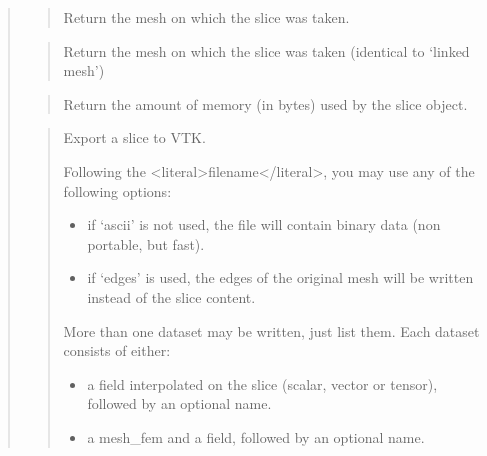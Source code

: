 \documentclass[a4paper,11pt,english]{sphinxmanual}
\begin{document}
\begin{quote}
\sphinxAtStartPar
{}
\begin{quote}

\sphinxAtStartPar
Return the mesh on which the slice was taken.
\end{quote}

\sphinxAtStartPar
{}
\begin{quote}

\sphinxAtStartPar
Return the mesh on which the slice was taken
(identical to ‘linked mesh’)
\end{quote}

\sphinxAtStartPar
{}
\begin{quote}

\sphinxAtStartPar
Return the amount of memory (in bytes) used by the slice object.
\end{quote}

\sphinxAtStartPar
{}
\begin{quote}

\sphinxAtStartPar
Export a slice to VTK.

\sphinxAtStartPar
Following the \textless{}literal\textgreater{}filename\textless{}/literal\textgreater{}, you may use any of the following options:
\begin{itemize}
\item {} 
\sphinxAtStartPar
if ‘ascii’ is not used, the file will contain binary data
(non portable, but fast).

\item {} 
\sphinxAtStartPar
if ‘edges’ is used, the edges of the original mesh will be
written instead of the slice content.

\end{itemize}

\sphinxAtStartPar
More than one dataset may be written, just list them. Each dataset
consists of either:
\begin{itemize}
\item {} 
\sphinxAtStartPar
a field interpolated on the slice (scalar, vector or tensor),
followed by an optional name.

\item {} 
\sphinxAtStartPar
a mesh\_fem and a field, followed by an optional name.


\end{itemize}
\end{quote}
\end{quote}
\end{document}
